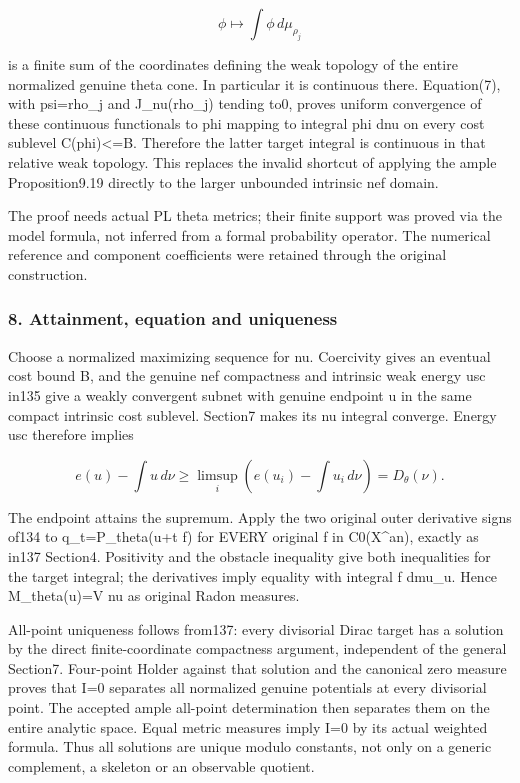 \documentclass[
]{article}
\begin{document}
\[\phi\longmapsto\int\phi\,d\mu_{\rho_j}\]

is a finite sum of the coordinates defining the weak topology of the
entire normalized genuine theta cone. In particular it is continuous
there. Equation(7), with psi=rho\_j and J\_nu(rho\_j) tending to0,
proves uniform convergence of these continuous functionals to phi
mapping to integral phi dnu on every cost sublevel C(phi)\textless=B.
Therefore the latter target integral is continuous in that relative weak
topology. This replaces the invalid shortcut of applying the ample
Proposition9.19 directly to the larger unbounded intrinsic nef domain.

The proof needs actual PL theta metrics; their finite support was proved
via the model formula, not inferred from a formal probability operator.
The numerical reference and component coefficients were retained through
the original construction.

\subsubsection{8. Attainment, equation and
uniqueness}\label{attainment-equation-and-uniqueness}

Choose a normalized maximizing sequence for nu. Coercivity gives an
eventual cost bound B, and the genuine nef compactness and intrinsic
weak energy usc in135 give a weakly convergent subnet with genuine
endpoint u in the same compact intrinsic cost sublevel. Section7 makes
its nu integral converge. Energy usc therefore implies

\[e(u)-\int u\,d\nu\geq\limsup_i\left(e(u_i)-\int u_i\,d\nu\right)=D_\theta(\nu).\]

The endpoint attains the supremum. Apply the two original outer
derivative signs of134 to q\_t=P\_theta(u+t f) for EVERY original f in
C0(X\^{}an), exactly as in137 Section4. Positivity and the obstacle
inequality give both inequalities for the target integral; the
derivatives imply equality with integral f dmu\_u. Hence M\_theta(u)=V
nu as original Radon measures.

All-point uniqueness follows from137: every divisorial Dirac target has
a solution by the direct finite-coordinate compactness argument,
independent of the general Section7. Four-point Holder against that
solution and the canonical zero measure proves that I=0 separates all
normalized genuine potentials at every divisorial point. The accepted
ample all-point determination then separates them on the entire analytic
space. Equal metric measures imply I=0 by its actual weighted formula.
Thus all solutions are unique modulo constants, not only on a generic
complement, a skeleton or an observable quotient.
\end{document}
